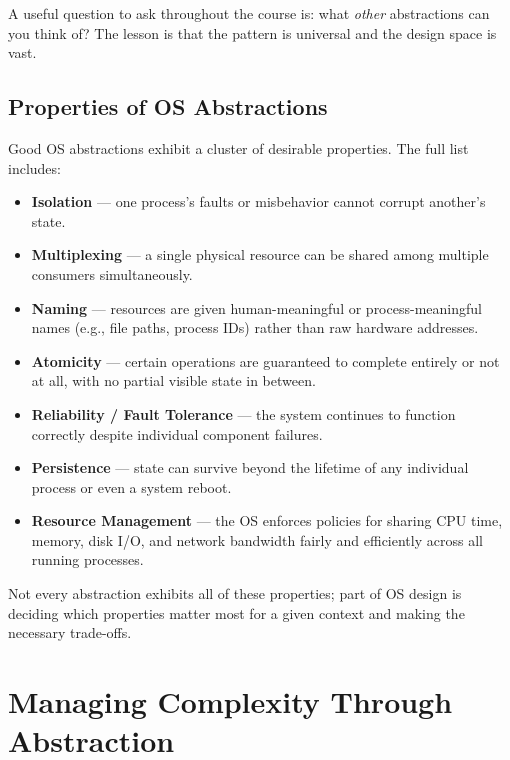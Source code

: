 \documentclass[11pt]{article}
\begin{document}
A useful question to ask throughout the course is: what \emph{other} abstractions can you think
of? The lesson is that the pattern is universal and the design space is vast.

\subsection{Properties of OS Abstractions}

Good OS abstractions exhibit a cluster of desirable properties. The full list includes:

\begin{itemize}
    \item \textbf{Isolation} --- one process's faults or misbehavior cannot corrupt another's state.
    \item \textbf{Multiplexing} --- a single physical resource can be shared among multiple
          consumers simultaneously.
    \item \textbf{Naming} --- resources are given human-meaningful or process-meaningful names
          (e.g., file paths, process IDs) rather than raw hardware addresses.
    \item \textbf{Atomicity} --- certain operations are guaranteed to complete entirely or not at
          all, with no partial visible state in between.
    \item \textbf{Reliability / Fault Tolerance} --- the system continues to function correctly
          despite individual component failures.
    \item \textbf{Persistence} --- state can survive beyond the lifetime of any individual process
          or even a system reboot.
    \item \textbf{Resource Management} --- the OS enforces policies for sharing CPU time, memory,
          disk I/O, and network bandwidth fairly and efficiently across all running processes.
\end{itemize}

Not every abstraction exhibits all of these properties; part of OS design is deciding which
properties matter most for a given context and making the necessary trade-offs.

\section{Managing Complexity Through Abstraction}
\end{document}
